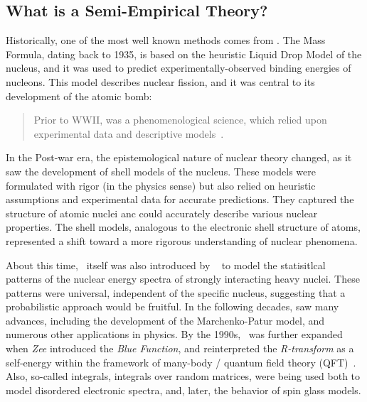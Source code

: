 \subsection{What is a Semi-Empirical Theory?}

Historically, one of the most well known \emph{\SemiEmpirical} methods comes from \NuclearPhysics.
The \SemiEmpirical Mass Formula, dating back to 1935, is based on the heuristic Liquid Drop Model of the nucleus,
and it was used to predict experimentally-observed binding energies of nucleons. 
This model describes nuclear fission, and it was central to its development of the atomic bomb:
\begin{quote}
  Prior to WWII, \NuclearPhysics was a phenomenological science, which relied upon experimental data and descriptive
  models~\cite{Negele05}.
\end{quote}
In the Post-war era, the epistemological nature of nuclear theory changed,
as it saw the development of \SemiEmpirical shell models of the nucleus.
These models were formulated with rigor (in the physics sense)
but also relied on heuristic assumptions and experimental data for accurate predictions.
They  captured  the structure of atomic nuclei
anc could accurately describe various nuclear properties\cite{Ivanenko1932, GoeppertMayer1949, Jensen1949}.
The shell models, analogous to the electronic shell structure of atoms,
represented a shift toward a more rigorous understanding of nuclear phenomena.

About this time, \RMT~itself was also introduced by \emph{\Wigner}~\cite{Wigner55}
to model the statisitlcal patterns of the nuclear energy spectra of 
strongly interacting heavy nuclei.
These patterns were universal, independent of the specific nucleus,
suggesting that a probabilistic approach would be fruitful.
In the following decades, \RMT saw many advances, including the development of
the Marchenko-Patur model\cite{MarchenkoPastur1967},
and numerous other applications in physics\cite{Guhr1998}.
By the 1990s, \RMT~was further expanded when \emph{Zee} introduced the \emph{Blue Function},
and reinterpreted the \emph{R-transform} as a self-energy within the
framework of many-body / quantum field theory (QFT)~\cite{Zee1996}.
Also, so-called \HCIZtext integrals, integrals over random matrices,
were being used both to model disordered electronic spectra\cite{SchultenRMT},
and, later, the behavior of spin glass models\cite{Bouchaud1998,Cherrier_2003}.

